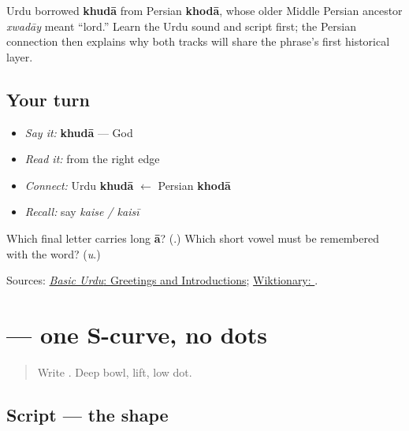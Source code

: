 \begin{cousinweb}
Urdu borrowed \textbf{khudā} from Persian \textbf{khodā}, whose older Middle Persian ancestor \emph{xwadāy} meant “lord.” Learn the Urdu sound and script first; the Persian connection then explains why both tracks will share the phrase's first historical layer.
\end{cousinweb}

\subsection*{Your turn}
\begin{itemize}
\raggedright
  \item \emph{Say it:} \textbf{khudā} — God
  \item \emph{Read it:} \textbf{} from the right edge
  \item \emph{Connect:} Urdu \textbf{khudā} $\leftarrow$ Persian \textbf{khodā}
  \item \emph{Recall:} say \emph{kaise / kaisī}
\end{itemize}

\begin{tcolorbox}[breakable,colback=teal!4,colframe=teal!35!black,title={Before you move on}]
Which final letter carries long \textbf{ā}? (\textbf{}.) Which short vowel must be remembered with the word? (\emph{u}.)

Sources: \href{https://openbooks.lib.msu.edu/urdu/chapter/2-2/}{\emph{Basic Urdu}: Greetings and Introductions}; \href{https://en.wiktionary.org/wiki/\%D8\%AE\%D8\%AF\%D8\%A7\#Urdu}{Wiktionary: }.
\end{tcolorbox}
\section[\texorpdfstring{\ur{ی} (ye)}{ی (ye)}]{ — one S-curve, no dots}

\label{lesson:UR-W05-ye}



\begin{quote}
Write . Deep bowl, lift, low dot.
\end{quote}

\subsection*{Script — the shape}

